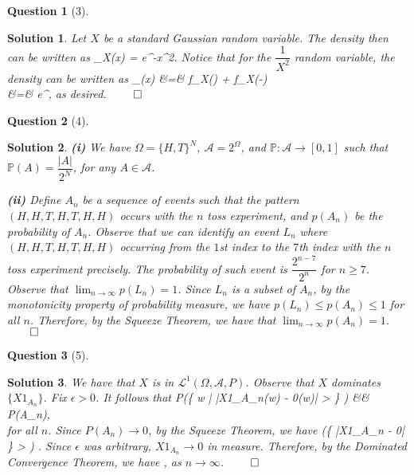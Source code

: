 \documentclass{article} %
\def\eQb#1\eQe{\begin{eqnarray*}#1\end{eqnarray*}}
\theoremstyle{quest}
\newtheorem*{question}{Question}
\newtheorem*{solution}{Solution}
\begin{document}
\bigskip

\begin{question}[3]
\end{question}
\begin{solution}
Let $X$ be a standard Gaussian random variable. The density then
can be written as
\eQb
f_X(x) = e^{-x^2}.
\eQe
Notice that for the $\dfrac{1}{X^2}$ random variable, the density
can be written as
\eQb
f_{}(x) &=& f_{X}() 
+ f_{X}(-) \\
&=& e^{}, 
\eQe 
as desired. $\qed$

\end{solution}

\bigskip

\begin{question}[4]
\end{question}
\begin{solution}
\textbf{(i)} We have $\Omega = \{H,T \}^N$, $\mathscr{A} = 2^{\Omega}$,
and $\mathbb{P}:\mathscr{A} \to [0,1]$ such that 
$\mathbb{P}(A) = \dfrac{|A|}{2^N}$, for any $A \in \mathscr{A}$.

\smallskip

\textbf{(ii)} Define $A_n$ be a sequence of events such that
the pattern $(H,H,T,H,T,H,H)$ occurs with the $n$ toss experiment,
and $p(A_n)$ be the probability of $A_n$. Observe that we can identify
an event $L_n$ where 
$(H,H,T,H,T,H,H)$ occurring from the $1$st index to the $7$th
index with the $n$ toss experiment precisely. The probability of
such event is $\dfrac{2^{n-7}}{2^n}$ for $n \geq 7$. Observe that
$\lim_{n \to \infty} p(L_n) = 1$. Since $L_n$ is a subset of $A_n$,
by the monotonicity property of probability measure, we have
$p(L_n) \leq p(A_n) \leq 1$ for all $n$. Therefore, by the Squeeze 
Theorem, we have that $\lim_{n \to \infty} p(A_n) = 1$. $\qed$ 
 

\end{solution}

\bigskip

\begin{question}[5]
\end{question}
\begin{solution}
We have that $X$ is in $\mathscr{L}^1(\Omega, \mathscr{A}, P)$. 
Observe that $X$ dominates $\{X 1_{A_n}\}$. Fix $\epsilon > 0$.
It follows that
\eQb
0 \leq 
P(\{ w \in \Omega | |X1_{A_n}(w) - 0(w)| > \epsilon\} ) &\leq& P(A_n), \\   
\eQe
for all $n$.
Since $P(A_n) \to 0$, by the Squeeze Theorem, we have 
\eQb
P(\{ |X1_{A_n} - 0| \} > \epsilon ) . 
\eQe
Since $\epsilon$ was arbitrary, $X1_{A_n} \to 0$ in measure. Therefore,
by the Dominated Convergence Theorem, we have
\eQb
E[X1_{A_n}] ,
\eQe 
as $n \to \infty$. $\qed$
\end{solution}
\end{document}
